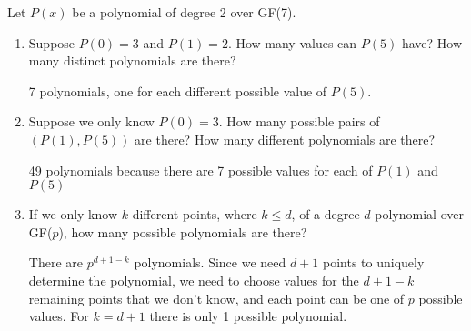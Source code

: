 \question 
Let $P(x)$ be a polynomial of degree 2 over GF(7).

\begin{enumerate}
    \item 
        Suppose $P(0) = 3$ and $P(1) = 2$.
        How many values can $P(5)$ have?
        How many distinct polynomials are there?

        \begin{solution}[0.8 in]
            7 polynomials, one for each different possible value of $P(5)$.
        \end{solution}

    \item
        Suppose we only know $P(0) = 3$.
        How many possible pairs of $(P(1), P(5))$ are there?
        How many different polynomials are there?

        \begin{solution}[0.8 in]
            49 polynomials because there are 7 possible values for each of $P(1)$ and $P(5)$
        \end{solution}

    \item
        If we only know $k$ different points, where $k \leq d$, of a degree $d$ polynomial over GF($p$), how many possible polynomials are there?

        \begin{solution}[0.8 in]
            There are $p^{d+1-k}$ polynomials.
            Since we need $d+1$ points to uniquely determine the polynomial, we need to choose values for the $d+1-k$ remaining points that we don't know, and each point can be one of $p$ possible values.
            For $k = d+1$ there is only 1 possible polynomial.
        \end{solution}
\end{enumerate}
